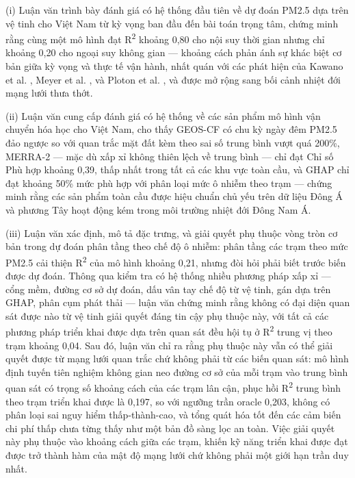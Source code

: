 (i) Luận văn trình bày đánh giá có hệ thống đầu tiên về dự đoán PM2.5 dựa trên vệ tinh cho Việt Nam từ kỳ vọng ban đầu đến bài toán trọng tâm, chứng minh rằng cùng một mô hình đạt R\textsuperscript{2} khoảng 0,80 cho nội suy thời gian nhưng chỉ khoảng 0,20 cho ngoại suy không gian --- khoảng cách phản ánh sự khác biệt cơ bản giữa kỳ vọng và thực tế vận hành, nhất quán với các phát hiện của Kawano et al. \cite{kawano2025}, Meyer et al. \cite{meyer2018}, và Ploton et al. \cite{ploton2020}, và được mở rộng sang bối cảnh nhiệt đới mạng lưới thưa thớt.

(ii) Luận văn cung cấp đánh giá có hệ thống về các sản phẩm mô hình vận chuyển hóa học cho Việt Nam, cho thấy GEOS-CF có chu kỳ ngày đêm PM2.5 đảo ngược so với quan trắc mặt đất kèm theo sai số trung bình vượt quá 200\%, MERRA-2 --- mặc dù xấp xỉ không thiên lệch về trung bình --- chỉ đạt Chỉ số Phù hợp khoảng 0,39, thấp nhất trong tất cả các khu vực toàn cầu, và GHAP chỉ đạt khoảng 50\% mức phù hợp với phân loại mức ô nhiễm theo trạm --- chứng minh rằng các sản phẩm toàn cầu được hiệu chuẩn chủ yếu trên dữ liệu Đông Á và phương Tây hoạt động kém trong môi trường nhiệt đới Đông Nam Á.

(iii) Luận văn xác định, mô tả đặc trưng, và giải quyết phụ thuộc vòng tròn cơ bản trong dự đoán phân tầng theo chế độ ô nhiễm: phân tầng các trạm theo mức PM2.5 cải thiện R\textsuperscript{2} của mô hình khoảng 0,21, nhưng đòi hỏi phải biết trước biến được dự đoán. Thông qua kiểm tra có hệ thống nhiều phương pháp xấp xỉ --- cổng mềm, đường cơ sở dự đoán, dấu vân tay chế độ từ vệ tinh, gán dựa trên GHAP, phân cụm phát thải --- luận văn chứng minh rằng không có đại diện quan sát được nào từ vệ tinh giải quyết đáng tin cậy phụ thuộc này, với tất cả các phương pháp triển khai được dựa trên quan sát đều hội tụ ở R\textsuperscript{2} trung vị theo trạm khoảng 0,04. Sau đó, luận văn chỉ ra rằng phụ thuộc này vẫn có thể giải quyết được từ mạng lưới quan trắc chứ không phải từ các biến quan sát: mô hình định tuyến tiên nghiệm không gian neo đường cơ sở của mỗi trạm vào trung bình quan sát có trọng số khoảng cách của các trạm lân cận, phục hồi R\textsuperscript{2} trung bình theo trạm triển khai được là 0,197, so với ngưỡng trần oracle 0,203, không có phân loại sai nguy hiểm thấp-thành-cao, và tổng quát hóa tốt đến các cảm biến chi phí thấp chưa từng thấy như một bản đồ sàng lọc an toàn. Việc giải quyết này phụ thuộc vào khoảng cách giữa các trạm, khiến kỹ năng triển khai được đạt được trở thành hàm của mật độ mạng lưới chứ không phải một giới hạn trần duy nhất.

